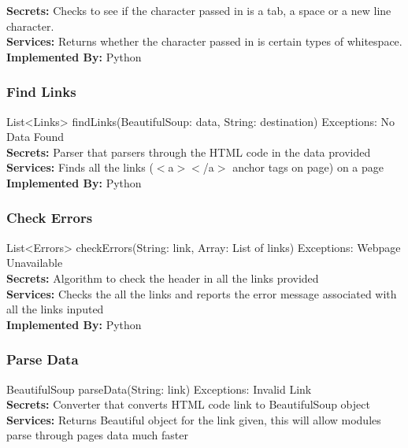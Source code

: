 \documentclass[titlepage]{article}
\begin{document}
\textbf{Secrets:}
Checks to see if the character passed in is a tab, a space or a new line character.\\

\textbf{Services:}
Returns whether the character passed in is certain types of whitespace.\\

\textbf{Implemented By:}
Python

\subsubsection{Find Links}
List<Links> findLinks(BeautifulSoup: data, String: destination) Exceptions: No Data Found\\

\textbf{Secrets:}
Parser that parsers through the HTML code in the data provided\\

\textbf{Services:}
Finds all the links ($<$a$>$$<$/a$>$ anchor tags on page) on a page \\

\textbf{Implemented By:}
Python

\subsubsection{Check Errors}
List<Errors> checkErrors(String: link, Array: List of links) Exceptions: Webpage Unavailable\\

\textbf{Secrets:}
Algorithm to check the header in all the links provided \\

\textbf{Services:}
Checks the all the links and reports the error message associated with all the links inputed\\

\textbf{Implemented By:} Python

\subsubsection{Parse Data}
BeautifulSoup parseData(String: link) Exceptions: Invalid Link\\

\textbf{Secrets:}
Converter that converts HTML code link to BeautifulSoup object \\

\textbf{Services:}
Returns Beautiful object for the link given, this will allow modules parse through pages data much faster\\
\end{document}
